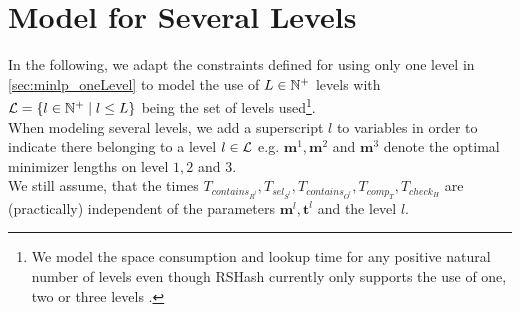 \documentclass[a4paper,titlepage,onecolumn,oneside,12pt,nenglish,titlepage=firstiscover]{scrbook}
\theoremstyle{plain} %
\theoremstyle{definition} %
\theoremstyle{remark} %
\theoremstyle{plain}
\newcommand{\NN}{\mathbb{N}} %
\newcommand{\minimizerLength}{m}
\newcommand{\threshold}{t}
\newcommand{\level}{l}
\newcommand{\contains}{contains}
\newcommand{\select}{sel}
\newcommand{\compare}{comp}
\newcommand{\timeForOperationOnStructure}[2]{T_{#1_{#2}}} %
\newcommand{\varMinimizerLength}{\textbf{\minimizerLength}}
\newcommand{\varThreshold}{\textbf{\threshold}}
\begin{document}
\section{Model for Several Levels}\label{sec:minlp_severalLevels}
In the following, we adapt the constraints defined for using only one level in \cref{sec:minlp_oneLevel} to model the use of $\numberOfLevels \in \NN^+$ levels with $\setOfLevels = \{ \level \in \NN^+ \mid \level \leq \numberOfLevels \}$ being the set of levels used\footnote{We model the space consumption and lookup time for any positive natural number of levels even though RSHash currently only supports the use of one, two or three levels \cite{schulte-mattler_rshash_2026}.}.\\
When modeling several levels, we add a superscript $\level$ to variables in order to indicate there belonging to a level $\level \in \setOfLevels$ e.g. $\varMinimizerLength^1, \varMinimizerLength^2$ and $\varMinimizerLength^3$ denote the optimal minimizer lengths on level $1,2$ and $3$.\\
We still assume, that the times $\timeForOperationOnStructure{\contains}{R^\level},\timeForOperationOnStructure{\select}{S^\level},\timeForOperationOnStructure{\contains}{O^\level},\timeForOperationOnStructure{\compare}{T},\timeForOperationOnStructure{check}{H}$ are (practically) independent of the parameters $\varMinimizerLength^\level, \varThreshold^\level$ and the level $\level$. 
\\
\end{document}
